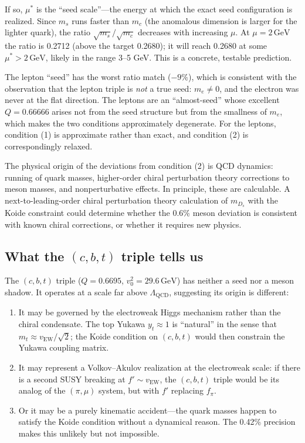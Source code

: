 \documentclass[12pt,a4paper]{article}
\newcommand{\GeV}{\,\text{GeV}}
\begin{document}
If so, $\mu^*$ is the ``seed scale''---the energy at which the 
exact seed configuration is realized. Since $m_s$ runs faster 
than $m_c$ (the anomalous dimension is larger for the lighter 
quark), the ratio $\sqrt{m_s}/\sqrt{m_c}$ decreases with 
increasing $\mu$. At $\mu = 2\GeV$ the ratio is 0.2712 (above 
the target 0.2680); it will reach 0.2680 at some 
$\mu^* > 2\GeV$, likely in the range 3--5 GeV. This is a 
concrete, testable prediction.

The lepton ``seed'' has the worst ratio match ($-9\%$), which 
is consistent with the observation that the lepton triple is 
\emph{not} a true seed: $m_e \neq 0$, and the electron was never 
at the flat direction. The leptons are an ``almost-seed'' whose 
excellent $Q = 0.66666$ arises not from the seed structure but 
from the smallness of $m_e$, which makes the two conditions 
approximately degenerate. For the leptons, condition (1) is 
approximate rather than exact, and condition (2) is correspondingly 
relaxed.

The physical origin of the deviations from condition (2) is 
QCD dynamics: running of quark masses, higher-order chiral 
perturbation theory corrections to meson masses, and 
nonperturbative effects. In principle, these are calculable. 
A next-to-leading-order chiral perturbation theory calculation 
of $m_{D_s}$ with the Koide constraint could determine 
whether the 0.6\% meson deviation is consistent with known 
chiral corrections, or whether it requires new physics.

\subsection{What the $(c,b,t)$ triple tells us}

The $(c,b,t)$ triple ($Q = 0.6695$, $v_0^2 = 29.6\GeV$) has 
neither a seed nor a meson shadow. It operates at a scale far 
above $\Lambda_{\text{QCD}}$, suggesting its origin is different:

\begin{enumerate}
\item It may be governed by the electroweak Higgs mechanism rather 
than the chiral condensate. The top Yukawa $y_t \approx 1$ is 
``natural'' in the sense that $m_t \approx v_{\text{EW}}/\sqrt{2}$; 
the Koide condition on $(c,b,t)$ would then constrain the Yukawa 
coupling matrix.
\item It may represent a Volkov--Akulov realization at the 
electroweak scale: if there is a second SUSY breaking at 
$f' \sim v_{\text{EW}}$, the $(c,b,t)$ triple would be its 
analog of the $(\pi, \mu)$ system, but with $f'$ replacing $f_\pi$.
\item Or it may be a purely kinematic accident---the quark masses 
happen to satisfy the Koide condition without a dynamical reason. 
The 0.42\% precision makes this unlikely but not impossible.
\end{enumerate}
\end{document}
